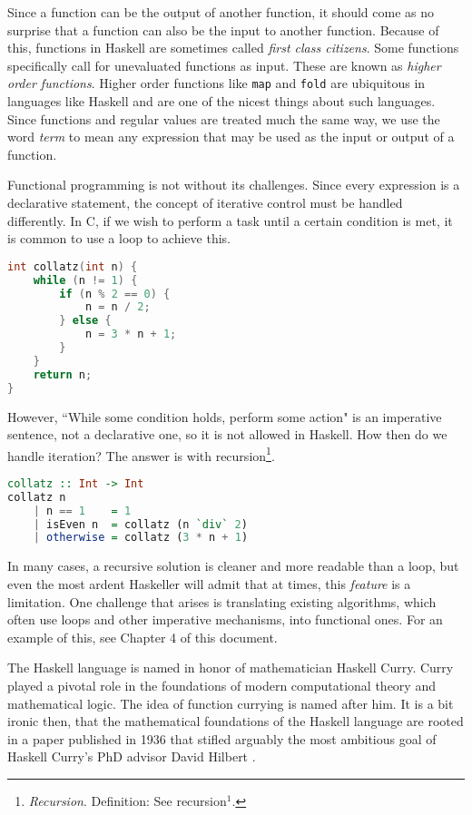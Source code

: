 \documentclass[MS, xcolor=dvipsnames]{wfuthesis}
\theoremstyle{definition}
\begin{document}
Since a function can be the output of another function, it should come as no surprise that a function can also be the input to another function. Because of this, functions in Haskell are sometimes called \emph{first class citizens}. Some functions specifically call for unevaluated functions as input. These are known as \emph{higher order functions}. Higher order functions like \lstinline{map} and \lstinline{fold} are ubiquitous in languages like Haskell and are one of the nicest things about such languages. Since functions and regular values are treated much the same way, we use the word \emph{term} to mean any expression that may be used as the input or output of a function. \par 
Functional programming is not without its challenges. Since every expression is a declarative statement, the concept of iterative control must be handled differently. In C, if we wish to perform a task until a certain condition is met, it is common to use a loop to achieve this. 
\begin{lstlisting}[language=C]
int collatz(int n) {
    while (n != 1) {
        if (n % 2 == 0) {
            n = n / 2;
        } else {
            n = 3 * n + 1;
        }
    }
    return n;
}
\end{lstlisting}
However, ``While some condition holds, perform some action" is an imperative sentence, not a declarative one, so it is not allowed in Haskell. How then do we handle iteration? The answer is with recursion\footnote{\emph{Recursion}. Definition: See recursion$^1$.}. 
\begin{lstlisting}[language=Haskell]
collatz :: Int -> Int
collatz n 
    | n == 1    = 1
    | isEven n  = collatz (n `div` 2)
    | otherwise = collatz (3 * n + 1)
\end{lstlisting}
In many cases, a recursive solution is cleaner and more readable than a loop, but even the most ardent Haskeller will admit that at times, this \emph{feature} is a limitation. One challenge that arises is translating existing algorithms, which often use loops and other imperative mechanisms, into functional ones. For an example of this, see Chapter 4 of this document. \par 
The Haskell language is named in honor of mathematician Haskell Curry. Curry played a pivotal role in the foundations of modern computational theory and mathematical logic. The idea of function currying is named after him. It is a bit ironic then, that the mathematical foundations of the Haskell language are rooted in a paper published in 1936 that stifled arguably the most ambitious goal of Haskell Curry's PhD advisor David Hilbert \cite{Hilbert1928}. \par 
\end{document}
